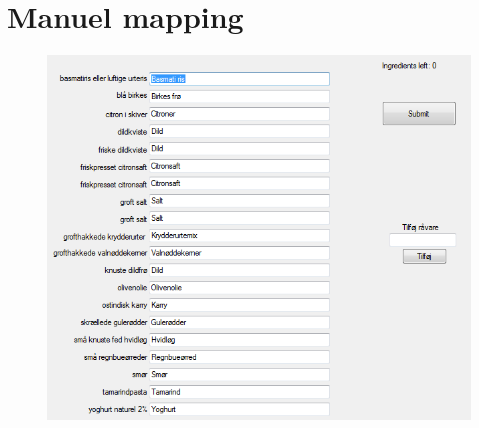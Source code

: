 \chapter{Manuel mapping}
\label{ap:manuel-mapping}

\begin{figure}
\centering
\includegraphics[scale=0.6]{billeder/manuel-mapping.png}
\end{figure}

